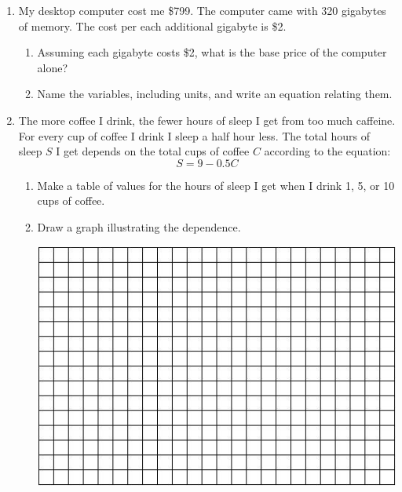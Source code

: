 \documentclass[12pt]{article}
\begin{document}
\begin{enumerate}


\item My desktop computer cost me \$799.  The computer came with 320 gigabytes of memory.  The cost per each additional gigabyte is \$2.  

\begin{enumerate}
\item Assuming each gigabyte costs \$2, what is the base price of the computer alone?
\vfill

\item Name the variables, including units, and write an equation relating them.
\vfill
\vfill
\end{enumerate}

\newpage %


\item The more coffee I drink, the fewer hours of sleep I get from too much caffeine.  For every cup of coffee I drink I sleep a half hour less.  The total hours of sleep $S$ I get depends on the total cups of coffee $C$ according to the equation: $$S=9-0.5C$$

\begin{enumerate}
\item Make a table of values for the hours of sleep I get when I drink 1, 5, or 10 cups of coffee. 
\vfill
\vfill
\item Draw a graph illustrating the dependence.  

\vspace{.1in}
\begin{center}
 {\includegraphics [width = 6in] {../GraphPaper}}
\end{center}
\vspace{.1in}


\end{enumerate}
\end{enumerate}
\end{document}
